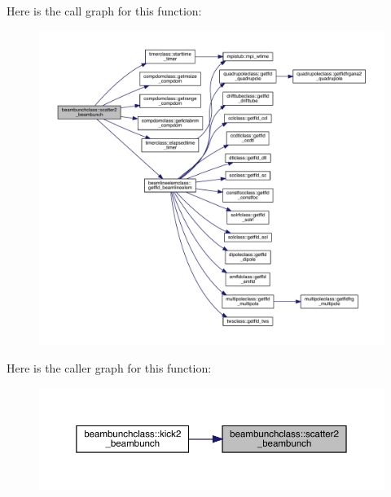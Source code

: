 Here is the call graph for this function\+:\nopagebreak
\begin{figure}[H]
\begin{center}
\leavevmode
\includegraphics[width=350pt]{namespacebeambunchclass_ad2054e6e5714a86db0112c5eb3978abb_cgraph}
\end{center}
\end{figure}
Here is the caller graph for this function\+:\nopagebreak
\begin{figure}[H]
\begin{center}
\leavevmode
\includegraphics[width=350pt]{namespacebeambunchclass_ad2054e6e5714a86db0112c5eb3978abb_icgraph}
\end{center}
\end{figure}
\mbox{\label{namespacebeambunchclass_a2395bc91f4fc52175d8a5cc92890bb83}} 
